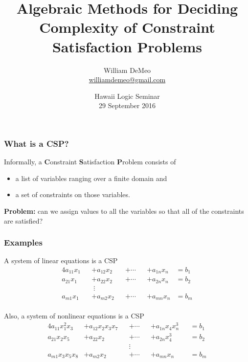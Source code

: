 \documentclass[12pt,xcolor=dvipsnames,mathserif%
   ]{beamer}
\renewcommand{\.}{\cdot}
\begin{document}
\title[Algebraic CSP]{Algebraic Methods for Deciding Complexity of Constraint Satisfaction Problems}
\author[\url{williamdemeo@gmail.com}]{William DeMeo\\
{\small \url{williamdemeo@gmail.com}}}

\date[29 Sep 2016]{Hawaii Logic Seminar\\[10pt]
29 September 2016}

\frame[plain]{\titlepage}


\begin{frame}
\frametitle{What is a CSP?}

  Informally, a \textbf{C}onstraint \textbf Satisfaction \textbf Problem
  consists of
  \begin{itemize}
  \item a list of variables ranging over a finite domain and
  \item a set of constraints on those variables.
  \end{itemize}

  \textbf{Problem:} can we assign values to all the variables so that
  all of the constraints are satisfied?

\end{frame}

\begin{frame}
  \frametitle{Examples}

A system of linear equations is a CSP
\begin{alignat*}4
  a_{11}x_1 &&+ a_{12}x_2 &&+ \cdots &&+ a_{1n}x_n &= b_1 \\
  a_{21}x_1 &&+ a_{22}x_2 &&+ \cdots &&+ a_{2n}x_n &= b_2 \\
  &&\;\vdots \\
  a_{m1}x_1 &&+ a_{m2}x_2 &&+ \cdots &&+ a_{mn}x_n &= b_m \\
\end{alignat*}
\end{frame}

\begin{frame}
  Also, a system of nonlinear equations is a CSP
\begin{alignat*}4
  a_{11}x_1^2x_3 &+ a_{12}x_2x_3x_7 &&+ \cdots &&+ a_{1n}x_4x_n^3 &&= b_1 \\
  a_{21}x_2x_5 &+ a_{22}x_2 &&+ \cdots &&+ a_{2n}x_4^3 &&= b_2 \\
 &&&\vdots \\
  a_{m1}x_3x_5x_8 &+ a_{m2}x_2 &&+ \cdots &&+ a_{mn}x_n &&= b_m \\
\end{alignat*}
\end{frame}
\end{document}

